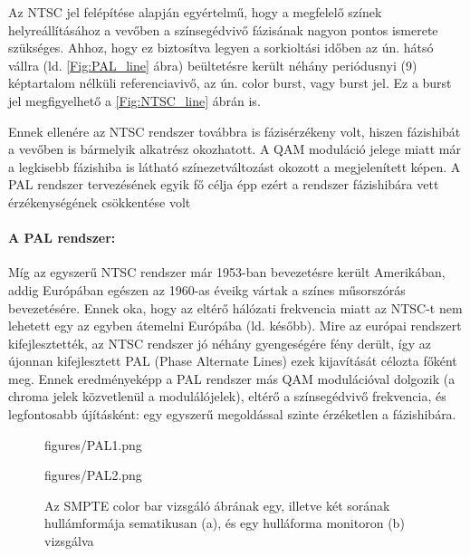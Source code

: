 Az NTSC jel felépítése alapján egyértelmű, hogy a megfelelő színek helyreállításához a vevőben a színsegédvivő fázisának nagyon pontos ismerete szükséges.
Ahhoz, hogy ez biztosítva legyen a sorkioltási időben az ún. hátsó vállra (ld. \ref{Fig:PAL_line} ábra) beültetésre került néhány periódusnyi (9) képtartalom nélküli referenciavivő, az ún. color burst, vagy burst jel.
Ez a burst jel megfigyelhető a \ref{Fig:NTSC_line} ábrán is.

Ennek ellenére az NTSC rendszer továbbra is fázisérzékeny volt, hiszen fázishibát a vevőben is bármelyik alkatrész okozhatott.
A QAM moduláció jelege miatt már a legkisebb fázishiba is látható színezetváltozást okozott a megjelenített képen.
A PAL rendszer tervezésének egyik fő célja épp ezért a rendszer fázishibára vett érzékenységének csökkentése volt

\paragraph{A PAL rendszer:}
Míg az egyszerű NTSC rendszer már 1953-ban bevezetésre került Amerikában, addig Európában egészen az 1960-as éveikg vártak a színes műsorszórás bevezetésére.
Ennek oka, hogy az eltérő hálózati frekvencia miatt az NTSC-t nem lehetett egy az egyben átemelni Európába (ld. később).
Mire az európai rendszert kifejlesztették, az NTSC rendszer jó néhány gyengeségére fény derült, így az újonnan kifejlesztett PAL (Phase Alternate Lines) ezek kijavítását célozta főként meg.
Ennek eredményeképp a PAL rendszer más QAM modulációval dolgozik (a chroma jelek közvetlenül a modulálójelek), eltérő a színsegédvivő frekvencia, és legfontosabb újításként: egy egyszerű megoldással szinte érzéketlen a fázishibára.
\begin{figure}[]
	\centering
	\begin{overpic}[width = 0.45\columnwidth ]{figures/PAL1.png}
	\end{overpic} \hfill
	\begin{overpic}[width = 0.45\columnwidth ]{figures/PAL2.png}
	\end{overpic} \hfill
	\caption{Az SMPTE color bar vizsgáló ábrának egy, illetve két sorának hullámformája sematikusan (a), és egy hulláforma monitoron (b) vizsgálva}
	\label{Fig:PAL1}
\end{figure}

